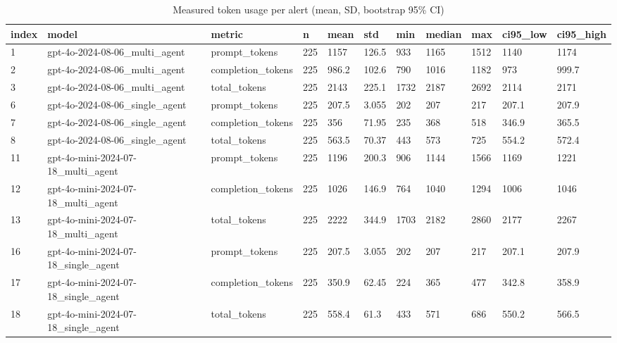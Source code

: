\begin{table}[!t]
\centering
\caption{Measured token usage per alert (mean, SD, bootstrap 95\% CI)}
\label{tab:tokens}
\begin{tabular}{lllllllllll}
\hline
index & model & metric & n & mean & std & min & median & max & ci95\_low & ci95\_high \\
\hline
1 & gpt-4o-2024-08-06\_multi\_agent & prompt\_tokens & 225 & 1157 & 126.5 & 933 & 1165 & 1512 & 1140 & 1174 \\
2 & gpt-4o-2024-08-06\_multi\_agent & completion\_tokens & 225 & 986.2 & 102.6 & 790 & 1016 & 1182 & 973 & 999.7 \\
3 & gpt-4o-2024-08-06\_multi\_agent & total\_tokens & 225 & 2143 & 225.1 & 1732 & 2187 & 2692 & 2114 & 2171 \\
6 & gpt-4o-2024-08-06\_single\_agent & prompt\_tokens & 225 & 207.5 & 3.055 & 202 & 207 & 217 & 207.1 & 207.9 \\
7 & gpt-4o-2024-08-06\_single\_agent & completion\_tokens & 225 & 356 & 71.95 & 235 & 368 & 518 & 346.9 & 365.5 \\
8 & gpt-4o-2024-08-06\_single\_agent & total\_tokens & 225 & 563.5 & 70.37 & 443 & 573 & 725 & 554.2 & 572.4 \\
11 & gpt-4o-mini-2024-07-18\_multi\_agent & prompt\_tokens & 225 & 1196 & 200.3 & 906 & 1144 & 1566 & 1169 & 1221 \\
12 & gpt-4o-mini-2024-07-18\_multi\_agent & completion\_tokens & 225 & 1026 & 146.9 & 764 & 1040 & 1294 & 1006 & 1046 \\
13 & gpt-4o-mini-2024-07-18\_multi\_agent & total\_tokens & 225 & 2222 & 344.9 & 1703 & 2182 & 2860 & 2177 & 2267 \\
16 & gpt-4o-mini-2024-07-18\_single\_agent & prompt\_tokens & 225 & 207.5 & 3.055 & 202 & 207 & 217 & 207.1 & 207.9 \\
17 & gpt-4o-mini-2024-07-18\_single\_agent & completion\_tokens & 225 & 350.9 & 62.45 & 224 & 365 & 477 & 342.8 & 358.9 \\
18 & gpt-4o-mini-2024-07-18\_single\_agent & total\_tokens & 225 & 558.4 & 61.3 & 433 & 571 & 686 & 550.2 & 566.5 \\
\hline
\end{tabular}
\end{table}

